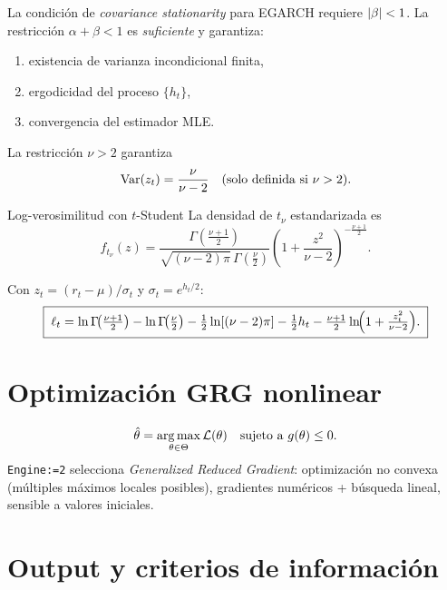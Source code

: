 \documentclass{claudeeditorial}
\begin{document}

\begin{ClaudeInfo}[Estacionariedad]
La condición de \emph{covariance stationarity} para EGARCH requiere $\lvert\beta\rvert<1$. La restricción $\alpha+\beta<1$ es \emph{suficiente} y garantiza:
\begin{enumerate}[leftmargin=1.2em,nosep]
\item existencia de varianza incondicional finita,
\item ergodicidad del proceso $\{h_t\}$,
\item convergencia del estimador MLE.
\end{enumerate}
\end{ClaudeInfo}

La restricción $\nu>2$ garantiza
\[
  \operatorname{Var}(z_t) = \frac{\nu}{\nu-2} \quad\text{(solo definida si } \nu>2\text{)}.
\]

\begin{ClaudeCard}{Log-verosimilitud con $t$-Student}
La densidad de $t_\nu$ estandarizada es
\[
  f_{t_\nu}(z) = \frac{\Gamma(\frac{\nu+1}{2})}{\sqrt{(\nu-2)\pi}\,\Gamma(\frac{\nu}{2})}
                \left(1 + \frac{z^2}{\nu-2}\right)^{-\frac{\nu+1}{2}}.
\]

Con $z_t = (r_t-\mu)/\sigma_t$ y $\sigma_t = e^{h_t/2}$:
\[
  \boxed{\;\ell_t = \ln\Gamma\!\bigl(\tfrac{\nu+1}{2}\bigr) - \ln\Gamma\!\bigl(\tfrac{\nu}{2}\bigr) - \tfrac{1}{2}\ln[(\nu-2)\pi] - \tfrac{1}{2}h_t - \tfrac{\nu+1}{2}\ln\!\Bigl(1 + \tfrac{z_t^2}{\nu-2}\Bigr).\;}
\]
\end{ClaudeCard}

\section{Optimización GRG nonlinear}

\begin{ClaudeTip}
\[
  \hat{\theta} = \operatorname*{arg\,max}_{\theta\in\Theta}\mathcal{L}(\theta) \quad \text{sujeto a } g(\theta)\leq 0.
\]
\texttt{Engine:=2} selecciona \emph{Generalized Reduced Gradient}: optimización no convexa (múltiples máximos locales posibles), gradientes numéricos + búsqueda lineal, sensible a valores iniciales.
\end{ClaudeTip}

\section{Output y criterios de información}
\end{document}
